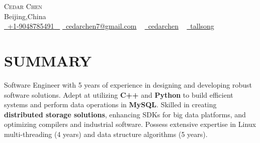 \documentclass[a4paper,20pt]{article}
\newcommand{\resumeSubHeadingListStart}{\begin{itemize}[leftmargin=0.0in, label={}]}
\newcommand{\resumeSubHeadingListEnd}{\end{itemize}}
\begin{document}
\vfill


\begin{center}
    {\Huge \scshape Cedar Chen}  \href{https://tallsong.github.io/}{\raisebox{0.7\height}\faExternalLink }     \\ \vspace{1pt}
    Beijing,China \\ \vspace{1pt}
    \small \href{tel:+19048785401}{ \raisebox{-0.1\height}\faPhone\ \underline{+1-9048785491} ~} \href{mailto:cedarchen7@gmail.com}{\raisebox{-0.2\height}\faEnvelope\  \underline{cedarchen7@gmail.com}} ~ 
    \href{https://linkedin.com/in/cedarchen}{\raisebox{-0.2\height}\faLinkedinSquare\ \underline{cedarchen}}  ~
    \href{https://github.com/tallsong}{\raisebox{-0.2\height}\faGithub\ \underline{tallsong}} ~    
    \vspace{-8pt}
\end{center}





\section{SUMMARY}

Software Engineer with 5 years of experience in designing and developing robust software solutions. Adept at utilizing \textbf{C++} and \textbf{Python} to build efficient systems and perform data operations in \textbf{MySQL}. Skilled in creating \textbf{distributed storage solutions}, enhancing SDKs for big data platforms, and optimizing compilers and industrial software. Possess extensive expertise in Linux multi-threading (4 years) and data structure algorithms (5 years).

        \vspace*{2.0\multicolsep}

\vspace{10pt}
\vspace{-12pt}
\end{document}
